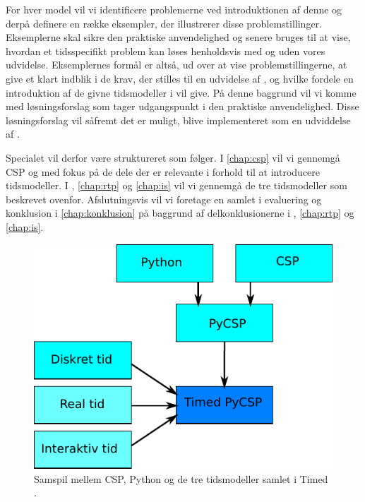 For hver model vil vi identificere problemerne ved introduktionen af denne og derpå definere en række eksempler, der illustrerer disse problemstillinger. Eksemplerne skal sikre den praktiske anvendelighed og senere bruges til at vise, hvordan et tidsspecifikt problem kan løses henholdsvis med og uden vores udvidelse. Eksemplernes formål er altså, ud over at vise problemstillingerne, at give et klart indblik i de krav, der stilles til en udvidelse af \pycsp, og hvilke fordele en introduktion af de givne tidsmodeller i \pycsp vil give. På denne baggrund vil vi komme med løsningsforslag som tager udgangspunkt i den praktiske anvendelighed. Disse løsningsforslag vil såfremt det er muligt, blive implementeret som en udviddelse af \pycsp.

Specialet vil derfor være struktureret som følger. I \autoref{chap:csp} vil vi gennemgå CSP og \pycsp med fokus på de dele der er relevante i forhold til at introducere tidsmodeller. I , \ref{chap:rtp} og \ref{chap:is} vil vi gennemgå de tre tidsmodeller som beskrevet ovenfor. Afslutningsvis vil vi foretage en samlet i evaluering og konklusion i \autoref{chap:konklusion} på baggrund af delkonklusionerne i , \ref{chap:rtp} og \ref{chap:is}.

\begin{figure}
 \begin{center}
  \includegraphics[scale=0.8]{images/intro}
	\caption{Samspil mellem CSP, Python og de tre tidsmodeller samlet i Timed \pycsp .}
	\label{fig:intro}
\end{center}
\end{figure}

